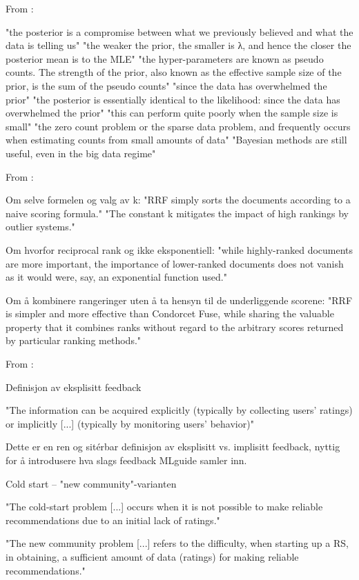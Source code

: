 From \parencite[Chapter~3.3]{murphy2012machine_learning_probabilistic_perspective}:

"the posterior is a compromise between what we previously believed and what the data is telling us"
"the weaker the prior, the smaller is λ, and hence the closer the posterior mean is to the MLE"
"the hyper-parameters are known as pseudo counts. The strength of the prior, also known as the effective sample size of the prior, is the sum of the pseudo counts"
"since the data has overwhelmed the prior"
"the posterior is essentially identical to the likelihood: since the data has overwhelmed the prior"
"this can perform quite poorly when the sample size is small"
"the zero count problem or the sparse data problem, and frequently occurs when estimating counts from small amounts of data"
"Bayesian methods are still useful, even in the big data regime"

From \parencite{cormack2009reciprocal_rank_fusion}:

Om selve formelen og valg av k:
"RRF simply sorts the documents according to a naive scoring formula."
"The constant k mitigates the impact of high rankings by outlier systems."

Om hvorfor reciprocal rank og ikke eksponentiell:
"while highly-ranked documents are more important, the importance of lower-ranked documents does not vanish as it would were, say, an exponential function used."

Om å kombinere rangeringer uten å ta hensyn til de underliggende scorene:
"RRF is simpler and more effective than Condorcet Fuse, while sharing the valuable property that it combines ranks without regard to the arbitrary scores returned by particular ranking methods."

From \parencite{bobadilla2013recommender_systems_survey}:


Definisjon av eksplisitt feedback

"The information can be acquired explicitly (typically by collecting users' ratings) or implicitly [...] (typically by monitoring users' behavior)"

Dette er en ren og sitérbar definisjon av eksplisitt vs. implisitt feedback, nyttig for å introdusere hva slags feedback MLguide samler inn.

Cold start – "new community"-varianten

"The cold-start problem [...] occurs when it is not possible to make reliable recommendations due to an initial lack of ratings."

"The new community problem [...] refers to the difficulty, when starting up a RS, in obtaining, a sufficient amount of data (ratings) for making reliable recommendations."

